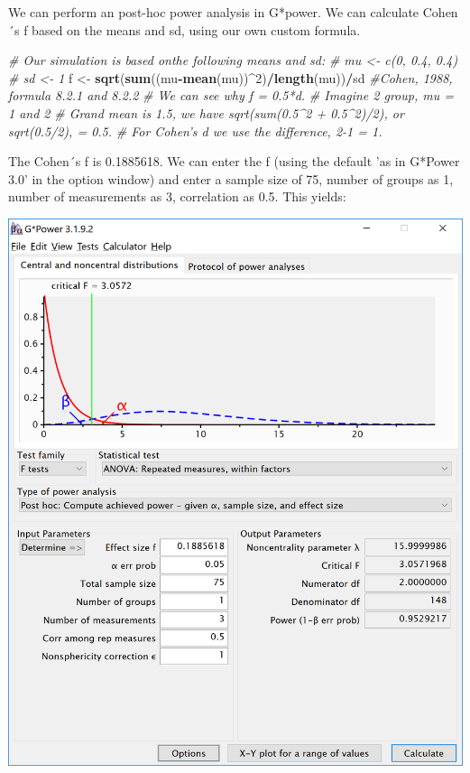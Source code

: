 \documentclass[]{book}
\newenvironment{Shaded}{\begin{snugshade}}{\end{snugshade}}
\newcommand{\CommentTok}[1]{\textcolor[rgb]{0.56,0.35,0.01}{\textit{#1}}}
\newcommand{\DecValTok}[1]{\textcolor[rgb]{0.00,0.00,0.81}{#1}}
\newcommand{\KeywordTok}[1]{\textcolor[rgb]{0.13,0.29,0.53}{\textbf{#1}}}
\newcommand{\NormalTok}[1]{#1}
\newcommand{\OperatorTok}[1]{\textcolor[rgb]{0.81,0.36,0.00}{\textbf{#1}}}
\newcommand{\StringTok}[1]{\textcolor[rgb]{0.31,0.60,0.02}{#1}}
\begin{document}
We can perform an post-hoc power analysis in G*power. We can calculate Cohen´s f based on the means and sd, using our own custom formula.

\begin{Shaded}
\begin{Highlighting}[]
\CommentTok{# Our simulation is based onthe following means and sd:}
\CommentTok{# mu <- c(0, 0.4, 0.4)}
\CommentTok{# sd <- 1}
\NormalTok{f <-}\StringTok{ }\KeywordTok{sqrt}\NormalTok{(}\KeywordTok{sum}\NormalTok{((mu}\OperatorTok{-}\KeywordTok{mean}\NormalTok{(mu))}\OperatorTok{^}\DecValTok{2}\NormalTok{)}\OperatorTok{/}\KeywordTok{length}\NormalTok{(mu))}\OperatorTok{/}\NormalTok{sd }\CommentTok{#Cohen, 1988, formula 8.2.1 and 8.2.2}
\CommentTok{# We can see why f = 0.5*d. }
\CommentTok{# Imagine 2 group, mu = 1 and 2}
\CommentTok{# Grand mean is 1.5, we have sqrt(sum(0.5^2 + 0.5^2)/2), or sqrt(0.5/2), = 0.5. }
\CommentTok{# For Cohen's d we use the difference, 2-1 = 1. }
\end{Highlighting}
\end{Shaded}

The Cohen´s f is 0.1885618. We can enter the f (using the default 'as in G*Power 3.0' in the option window) and enter a sample size of 75, number of groups as 1, number of measurements as 3, correlation as 0.5. This yields:

\includegraphics{screenshots/gpower_3.png}
\end{document}
